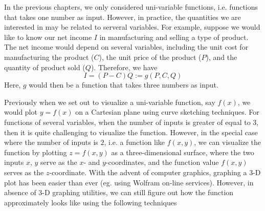 In the previous chapters, we only considered uni-variable functions, i.e. functions that takes one number as input.  However, in practice, the quantities we are interested in may be related to serveral variables.  For example, suppose we would like to know our net income $I$ in manufacturing and selling a type of product.  The net income would depend on several variables, including the unit cost for manufacturing the product ($C$), the unit price of the product ($P$), and the quantity of product sold ($Q$).  Therefore, we have 
\[I = (P-C)Q := g(P,C,Q)\]
Here, $g$ would then be a function that takes three numbers as input.  

Previously when we set out to visualize a uni-variable function, say $f(x)$, we would plot $y = f(x)$ on a Cartesian plane using curve sketching techniques.  For functions of several variables, when the number of inputs is greater of equal to $3$, then it is quite challenging to visualize the function.  However, in the special case where the number of inputs is $2$, i.e. a function like $f(x,y)$, we can visualize the function by plotting $z = f(x, y)$ as a three-dimensional surface, where the two inputs $x$, $y$ serve as the $x$- and $y$-coordinates, and the function value $f(x,y)$ serves as the $z$-coordinate.  With the advent of computer graphics, graphing a 3-D plot has been easier than ever (eg. using Wolfram on-line services).  However, in absence of 3-D graphing utilities, we can still figure out how the function approximately looks like using the following techniques

